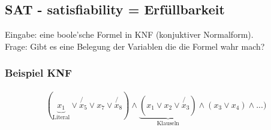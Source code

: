 \subsection{SAT - satisfiability = Erfüllbarkeit}
Eingabe: eine boole'sche Formel in KNF (konjuktiver Normalform).\\
Frage: Gibt es eine Belegung der Variablen die die Formel wahr mach?\\
\subsubsection{Beispiel KNF}
\begin{align*}
( \underbrace{x_1}_{\text{Literal}} \lor \not{x_5} \lor x_7 \lor \not{x_8}) \land \underbrace{ (x_1 \lor x_2 \lor \not{x_3})}_{\text{Klauseln}} \land (x_3 \lor x_4) \land ...)
\end{align*}
